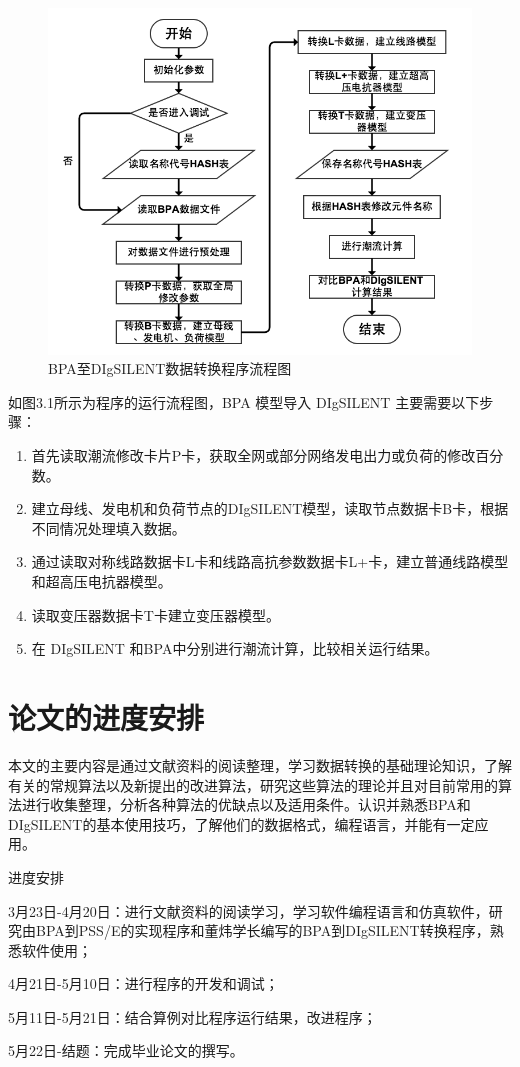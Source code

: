 \begin{figure}[H]
\centering
\includegraphics[width=1.05\textwidth]{images/Paper_Fig_12.png}
\setcaptionwidth{\linewidth}
\caption{BPA至DIgSILENT数据转换程序流程图}
\end{figure}

如图3.1所示为程序的运行流程图，BPA 模型导入 DIgSILENT 主要需要以下步骤：
  \begin{enumerate}[1)]
  \item 首先读取潮流修改卡片P卡，获取全网或部分网络发电出力或负荷的修改百分数。
  \item 建立母线、发电机和负荷节点的DIgSILENT模型，读取节点数据卡B卡，根据不同情况处理填入数据。
  \item 通过读取对称线路数据卡L卡和线路高抗参数数据卡L+卡，建立普通线路模型和超高压电抗器模型。
  \item 读取变压器数据卡T卡建立变压器模型。
  \item 在 DIgSILENT 和BPA中分别进行潮流计算，比较相关运行结果。
  \end{enumerate}

\section{论文的进度安排}

本文的主要内容是通过文献资料的阅读整理，学习数据转换的基础理论知识，了解有关的常规算法以及新提出的改进算法，研究这些算法的理论并且对目前常用的算法进行收集整理，分析各种算法的优缺点以及适用条件。认识并熟悉BPA和DIgSILENT的基本使用技巧，了解他们的数据格式，编程语言，并能有一定应用。

进度安排

3月23日-4月20日：进行文献资料的阅读学习，学习软件编程语言和仿真软件，研究由BPA到PSS/E的实现程序和董炜学长编写的BPA到DIgSILENT转换程序，熟悉软件使用；

4月21日-5月10日：进行程序的开发和调试；

5月11日-5月21日：结合算例对比程序运行结果，改进程序；

5月22日-结题：完成毕业论文的撰写。


